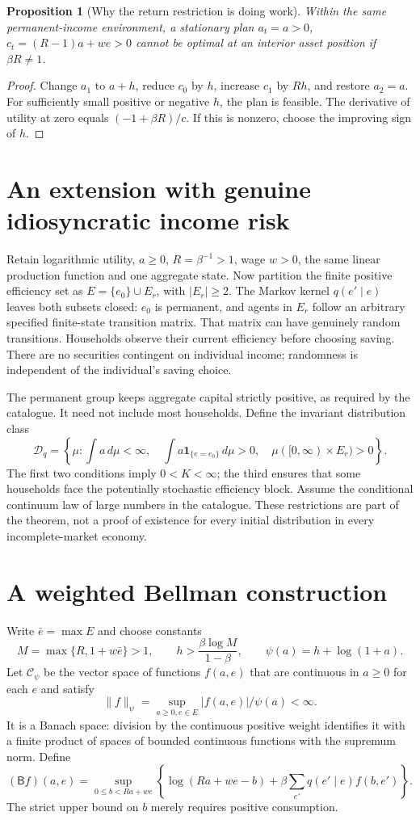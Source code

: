 \documentclass[11pt]{article}
\newtheorem{proposition}{Proposition}
\theoremstyle{definition}
\begin{document}
\begin{proposition}[Why the return restriction is doing work]
Within the same permanent-income environment, a stationary plan $a_t=a>0$, $c_t=(R-1)a+we>0$ cannot be optimal at an interior asset position if $\beta R\ne1$.
\end{proposition}
\begin{proof}
Change $a_1$ to $a+h$, reduce $c_0$ by $h$, increase $c_1$ by $Rh$, and restore $a_2=a$. For sufficiently small positive or negative $h$, the plan is feasible. The derivative of utility at zero equals $(-1+\beta R)/c$. If this is nonzero, choose the improving sign of $h$.
\end{proof}


\section*{An extension with genuine idiosyncratic income risk}
Retain logarithmic utility, $a\geq0$, $R=\beta^{-1}>1$, wage $w>0$,
the same linear production function and one aggregate state. Now partition
the finite positive efficiency set as $E=\{e_0\}\cup E_r$, with
$|E_r|\geq2$. The Markov kernel $q(e'\mid e)$ leaves both subsets
closed: $e_0$ is permanent, and agents in $E_r$ follow an arbitrary
specified finite-state transition matrix. That matrix can have genuinely
random transitions. Households observe their current efficiency before
choosing saving. There are no securities contingent on individual income;
randomness is independent of the individual's saving choice.

The permanent group keeps aggregate capital strictly positive, as required
by the catalogue. It need not include most households. Define the invariant distribution class
\[
 \mathcal D_q=\left\{\mu:\int a\,d\mu<\infty,\quad
       \int a\mathbf1_{\{e=e_0\}}\,d\mu>0,\quad
       \mu([0,\infty)\times E_r)>0\right\}.
\]
The first two conditions imply $0<K<\infty$; the third ensures that
some households face the potentially stochastic efficiency block. Assume
the conditional continuum law of large numbers in the catalogue. These
restrictions are part of the theorem, not a proof of existence for every
initial distribution in every incomplete-market economy.

\section*{A weighted Bellman construction}
Write $\bar e=\max E$ and choose constants
\[
 M=\max\{R,1+w\bar e\}>1,\qquad
 h>\frac{\beta\log M}{1-\beta},\qquad
 \psi(a)=h+\log(1+a).
\]
Let $\mathcal C_\psi$ be the vector space of functions $f(a,e)$ that
are continuous in $a\geq0$ for each $e$ and satisfy
\[
 \|f\|_\psi=\sup_{a\geq0,e\in E}|f(a,e)|/\psi(a)<\infty.
\]
It is a Banach space: division by the continuous positive weight
identifies it with a finite product of spaces of bounded continuous
functions with the supremum norm. Define
\[
 (\mathsf B f)(a,e)=
 \sup_{0\leq b<Ra+we}
 \left\{\log(Ra+we-b)+\beta\sum_{e'}q(e'\mid e)f(b,e')\right\}.
\]
The strict upper bound on $b$ merely requires positive consumption.
\end{document}
